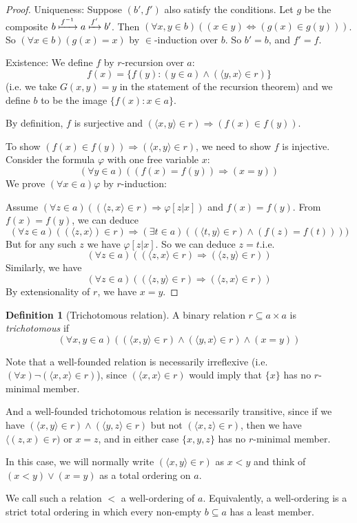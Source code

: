 \documentclass[a4paper]{article}
\theoremstyle{definition}
\newtheorem*{defi}{Definition}
\newcommand{\bra}{\langle}
\newcommand{\ket}{\rangle}
\begin{document}
\begin{proof}
  Uniqueness: Suppose $(b', f')$ also satisfy the conditions. Let $g$ be the composite $b\xmapsto{f^{-1}}a\xmapsto{f'} b'$. Then $(\forall x, y\in b)((x\in y)\Leftrightarrow (g(x)\in g(y)))$. So $(\forall x\in b)(g(x) = x)$ by $\in$-induction over $b$. So $b' = b$, and $f' = f$.

  Existence: We define $f$ by $r$-recursion over $a$:
  \[
  f(x) = \{f(y): (y\in a)\wedge (\bra y, x\ket\in r)\}
  \]
  (i.e. we take $G(x, y) = y$ in the statement of the recursion theorem)
  and we define $b$ to be the image $\{f(x): x\in a\}$.

  By definition, $f$ is surjective and $(\bra x, y\ket \in r)\Rightarrow (f(x)\in f(y))$.

  To show $(f(x)\in f(y))\Rightarrow (\bra x, y\ket\in r)$, we need to show $f$ is injective. Consider the formula $\varphi$ with one free variable $x$:
  \[
  (\forall y\in a)((f(x) = f(y))\Rightarrow (x = y))
  \]
  We prove $(\forall x\in a)\varphi$ by $r$-induction:

  Assume $(\forall z\in a)((\bra z, x\ket\in r)\Rightarrow \varphi[z|x])$ and $f(x)= f(y)$.
  From $f(x) = f(y)$, we can deduce
  \[
  (\forall z\in a)((\bra z, x\ket)\in r)\Rightarrow (\exists t\in a)((\bra t, y\ket \in r)\wedge (f(z) = f(t))))
  \]
  But for any such $z$ we have $\varphi[z|x]$. So we can deduce $z = t$.i.e. 
  \[
  (\forall z\in a)((\bra z, x\ket \in r)\Rightarrow (\bra z, y\ket \in r))
  \]
  Similarly, we have 
  \[
  (\forall z\in a)((\bra z, y\ket \in r)\Rightarrow (\bra z, x\ket \in r))
  \]
  By extensionality of $r$, we have $x = y$.
\end{proof}

\begin{defi}[Trichotomous relation]
  A binary relation $r\subseteq a\times a$ is \emph{trichotomous} if
  \[
  (\forall x, y\in a)((\bra x, y\ket \in r)\wedge (\bra y, x\ket \in r)\wedge (x = y))
  \]

  Note that a well-founded relation is necessarily irreflexive (i.e. $(\forall x)\neg (\bra x, x\ket\in r)$), since $(\bra x, x\ket \in r)$ would imply that $\{x\}$ has no $r$-minimal member.

  And a well-founded trichotomous relation is necessarily transitive, since if we have $(\bra x, y\ket\in r)\wedge (\bra y, z\ket \in r)$ but not $(\bra x, z\ket \in r)$, then we have $\bra (z, x)\in r)$ or $x = z$, and in either case $\{x, y, z\}$ has no $r$-minimal member.

  In this case, we will normally write $(\bra x, y\ket \in r)$ as $x < y$ and think of $(x < y)\vee (x = y)$ as a total ordering on $a$.

  We call such a relation $<$ a well-ordering of $a$. Equivalently, a well-ordering is a strict total ordering in which every non-empty $b\subseteq a$ has a least member.
\end{defi}
\end{document}
